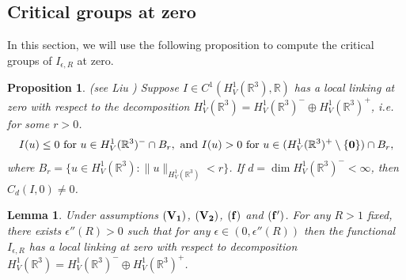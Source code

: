 \documentclass[12pt]{amsart}
\numberwithin{equation}{section}
\newtheorem{lemma}[theorem]{Lemma}
\newtheorem{proposition}[theorem]{Proposition}
\theoremstyle{definition}
\begin{document}
\subsection{Critical groups at zero}
In this section, we will use the following proposition to compute the critical groups of $I_{\epsilon,R}$ at zero.
\begin{proposition}\label{pro2}(see Liu \cite{MR994751})
Suppose $I\in C^{1}(H^{1}_{V}(\mathbb{R}^3),\mathbb{R})$ has a local linking at zero with respect to the decomposition $H^{1}_{V}(\mathbb{R}^3)=H^{1}_{V}(\mathbb{R}^3)^{-}\oplus H^{1}_{V}(\mathbb{R}^3)^{+}$, i.e. for some $r>0$.
\begin{equation*}
\begin{aligned}
I(u)\leq0\  \mbox{for}\ u\in H^{1}_{V}(\mathbb{R}^3)^{-}\cap B_{r},\ \mbox{and}\ I(u)>0\  \mbox{for}\ u\in (H^{1}_{V}(\mathbb{R}^3)^{+}\setminus\{{\bf 0}\})\cap B_{r},
\end{aligned}
\end{equation*}
where $B_{r}=\{u\in H^{1}_{V}(\mathbb{R}^3): \|u\|_{H^{1}_{V}(\mathbb{R}^3)}<r\}$. If $d=\dim H^{1}_{V}(\mathbb{R}^3)^{-}<\infty$, then $C_{d}(I,0)\neq0$.
\end{proposition}
\begin{lemma}\label{lem5}
Under assumptions ${\bf (V_1)}$, ${\bf (V_2)}$, ${\bf (f)}$ and ${\bf (f')}$. For any $R>1$ fixed, there exists $\epsilon''(R)>0$ such that for any $\epsilon\in(0,\epsilon''(R))$ then the functional $I_{\epsilon,R}$ has a local linking at zero with respect to decomposition $H^{1}_{V}(\mathbb{R}^3)=H^{1}_{V}(\mathbb{R}^3)^{-}\oplus H^{1}_{V}(\mathbb{R}^3)^{+}$.
\end{lemma}
\end{document}
